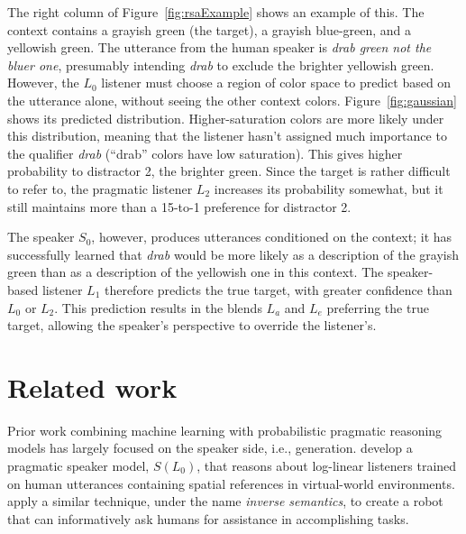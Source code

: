 \documentclass[11pt,letterpaper]{article}
\newcommand{\term}{\textit}
\newcommand{\word}{\textit}
\newcommand{\Listener}{L}
\newcommand{\Speaker}{S}
\renewcommand{\|}{\mid}
\newcommand{\Figref}[1]{Figure~\ref{#1}}
\newcommand{\figref}[1]{Figure~\ref{#1}}
\begin{document}
The right column of \figref{fig:rsaExample} shows an example of this. The context
contains a grayish green (the target), a grayish blue-green, and a yellowish green.
The utterance from the human speaker is \word{drab green not the bluer one},
presumably intending \word{drab} to exclude the brighter yellowish green. However,
the $\Listener_0$ listener must choose a region of color space to predict based on
the utterance alone, without seeing the other context colors. \Figref{fig:gaussian}
shows its predicted distribution. Higher-saturation colors are more likely
under this distribution, meaning that the listener hasn't assigned much importance
to the qualifier \word{drab} (``drab'' colors have low saturation). This gives higher 
probability to distractor 2, the brighter green. Since the
target is rather difficult to refer to, the pragmatic listener $\Listener_2$
increases its probability somewhat, but it still maintains more than a 15-to-1
preference for distractor 2.

The speaker $\Speaker_0$, however, produces utterances
conditioned on the context; it has successfully learned that \textit{drab}
would be more likely as a description of the grayish green than as a description
of the yellowish one in this context. The speaker-based listener $\Listener_1$
therefore predicts the true target, with greater confidence than $\Listener_0$
or $\Listener_2$. This prediction results in the blends $\Listener_a$ and
$\Listener_e$ preferring the true target, allowing the speaker's perspective
to override the listener's.

\section{Related work}

Prior work combining machine learning with probabilistic pragmatic reasoning
models has largely focused on the speaker side, i.e., generation.
 develop a pragmatic speaker model,
$\Speaker(\Listener_0)$, that reasons about log-linear listeners trained on human
utterances containing spatial references in virtual-world environments.
 apply a similar technique, under the name
\term{inverse semantics}, to create a robot that can informatively ask
humans for assistance in accomplishing tasks. %
\end{document}
